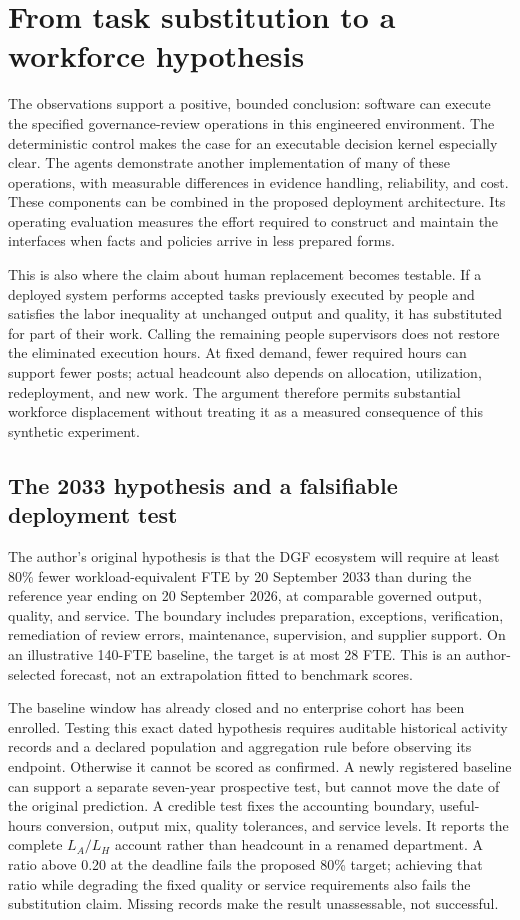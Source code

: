 \section{From task substitution to a workforce hypothesis}
\label{sec:implications}

The observations support a positive, bounded conclusion: software can execute the specified
governance-review operations in this engineered environment. The deterministic control makes
the case for an executable decision kernel especially clear. The agents demonstrate another
implementation of many of these operations, with measurable differences in evidence handling,
reliability, and cost. These components can be combined in the proposed deployment architecture.
Its operating evaluation measures the effort required to construct and maintain the interfaces
when facts and policies arrive in less prepared forms.

This is also where the claim about human replacement becomes testable. If a deployed system
performs accepted tasks previously executed by people and satisfies the labor inequality at
unchanged output and quality, it has substituted for part of their work. Calling the remaining
people supervisors does not restore the eliminated execution hours. At fixed demand, fewer
required hours can support fewer posts; actual headcount also depends on allocation, utilization,
redeployment, and new work. The argument therefore permits substantial workforce displacement
without treating it as a measured consequence of this synthetic experiment.

\subsection{The 2033 hypothesis and a falsifiable deployment test}

The author's original hypothesis is that the DGF ecosystem will require at least 80\% fewer
workload-equivalent FTE by 20 September 2033 than during the reference year ending on
20 September 2026, at comparable governed output, quality, and service. The boundary includes
preparation, exceptions, verification, remediation of review errors, maintenance, supervision,
and supplier support. On an illustrative 140-FTE baseline, the target is at most 28 FTE.
This is an author-selected forecast, not an extrapolation fitted to benchmark scores.

The baseline window has already closed and no enterprise cohort has been enrolled. Testing
this exact dated hypothesis requires auditable historical activity records and a declared
population and aggregation rule before observing its endpoint. Otherwise it cannot be scored
as confirmed. A newly registered baseline can support a separate seven-year prospective test,
but cannot move the date of the original prediction. A credible test fixes the accounting
boundary, useful-hours conversion, output mix, quality tolerances, and service levels. It
reports the complete $L_A/L_H$ account rather than headcount in a renamed department. A ratio
above 0.20 at the deadline fails the proposed 80\% target; achieving that ratio while degrading
the fixed quality or service requirements also fails the substitution claim. Missing records
make the result unassessable, not successful.

